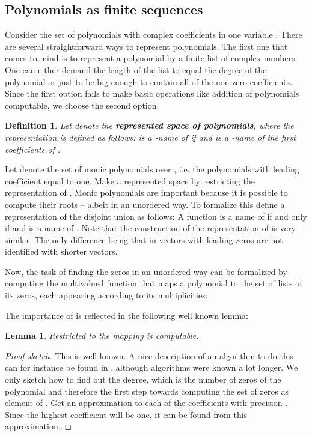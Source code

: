 \documentclass{eptcs-modified}
\newtheorem{definition}[theorem]{Definition}
\newtheorem{lemma}[theorem]{Lemma}
\newcommand{\demph}{\textbf}
\begin{document}
		\subsection{Polynomials as finite sequences}\label{sec:sub:polynomials as finite sequences}

			Consider the set  of polynomials with complex coefficients in one variable .
			There are several straightforward ways to represent polynomials.
			The first one that comes to mind is to represent a polynomial by a finite list of complex numbers.
			One can either demand the length of the list to equal the degree of the polynomial or just to be big enough to contain all of the non-zero coefficients.
			Since the first option fails to make basic operations like addition of polynomials computable, we choose the second option.

			\begin{definition}
				Let  denote the \demph{represented space of polynomials}, where the representation is defined as follows:  is a -name of  if  and  is a -name of the first  coefficients of .
			\end{definition}

			Let  denote the set of monic polynomials over , i.e. the polynomials with leading coefficient equal to one.
			Make  a represented space by restricting the representation of .
			Monic polynomials are important because it is possible to compute their roots -- albeit in an unordered way.
			To formalize this define a representation of the disjoint union  as follows:
			A function  is a name of  if and only if  and  is a  name of .
			Note that the construction of the representation of  is very similar.
			The only difference being that in  vectors with leading zeros are not identified with shorter vectors.

			Now, the task of finding the zeros in an unordered way can be formalized by computing the multivalued function that maps a polynomial to the set of lists of its zeros, each appearing according to its multiplicities:
			
			The importance of  is reflected in the following well known lemma:

			\begin{lemma}\label{resu:computable operations on the polynomials}
				Restricted to  the mapping  is computable.
			\end{lemma}

			\begin{proof}[Proof sketch]
				This is well known.
				A nice description of an algorithm to do this can for instance be found in \cite{MR1905263}, although algorithms were known a lot longer.
				We only sketch how to find out the degree, which is the number of zeros of the polynomial and therefore the first step towards computing the set of zeros as element of .
				Get an approximation to each of the coefficients with precision .
				Since the highest coefficient will be one, it can be found from this approximation.
			\end{proof}
\end{document}
